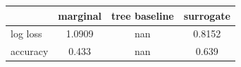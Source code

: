 \begin{tabular}{lccc}
\toprule
 & marginal & tree baseline & surrogate \\
\midrule
log loss & 1.0909 & nan & 0.8152 \\
accuracy & 0.433 & nan & 0.639 \\
\bottomrule
\end{tabular}
